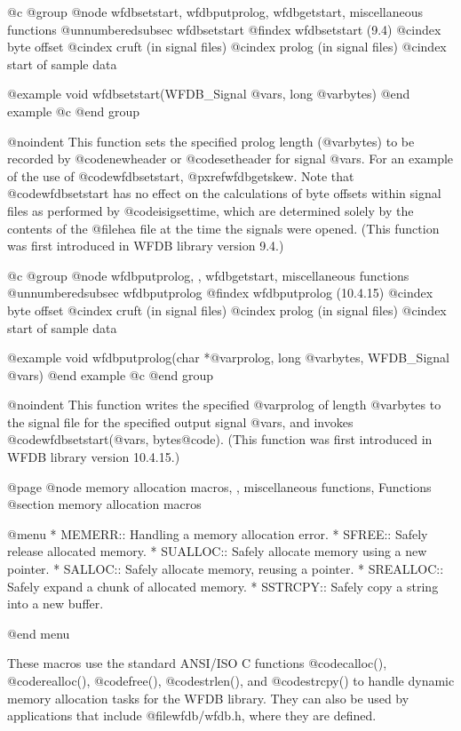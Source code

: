 {{{{{{{{{@c @group
@node     wfdbsetstart, wfdbputprolog, wfdbgetstart, miscellaneous functions
@unnumberedsubsec wfdbsetstart
@findex wfdbsetstart (9.4)
@cindex byte offset
@cindex cruft (in signal files)
@cindex prolog (in signal files)
@cindex start of sample data

@example
void wfdbsetstart(WFDB_Signal @var{s}, long @var{bytes})
@end example
@c @end group

@noindent
This function sets the specified prolog length (@var{bytes}) to be
recorded by @code{newheader} or @code{setheader} for signal @var{s}.
For an example of the use of @code{wfdbsetstart}, @pxref{wfdbgetskew}.  Note
that @code{wfdbsetstart} has no effect on the calculations of byte offsets
within signal files as performed by @code{isigsettime}, which are
determined solely by the contents of the @file{hea} file at the time
the signals were opened.  (This function was first introduced in WFDB library
version 9.4.)

@c @group
@node     wfdbputprolog, , wfdbgetstart, miscellaneous functions
@unnumberedsubsec wfdbputprolog
@findex wfdbputprolog (10.4.15)
@cindex byte offset
@cindex cruft (in signal files)
@cindex prolog (in signal files)
@cindex start of sample data

@example
void wfdbputprolog(char *@var{prolog}, long @var{bytes}, WFDB_Signal @var{s})
@end example
@c @end group

@noindent
This function writes the specified @var{prolog} of length @var{bytes} to the
signal file for the specified output signal @var{s}, and invokes
@code{wfdbsetstart(}@var{s, bytes}@code{)}.  (This function was first
introduced in WFDB library version 10.4.15.)

@page
@node memory allocation macros, , miscellaneous functions, Functions
@section memory allocation macros

@menu
* MEMERR::                      Handling a memory allocation error.
* SFREE::                       Safely release allocated memory.
* SUALLOC::                     Safely allocate memory using a new pointer.
* SALLOC::                      Safely allocate memory, reusing a pointer.
* SREALLOC::                    Safely expand a chunk of allocated memory.
* SSTRCPY::                     Safely copy a string into a new buffer.

@end menu

These macros use the standard ANSI/ISO C functions @code{calloc()},
@code{realloc()}, @code{free()}, @code{strlen()}, and @code{strcpy()} to handle
dynamic memory allocation tasks for the WFDB library.  They can also be used by
applications that include @file{wfdb/wfdb.h}, where they are defined.

}}}}}}}}}
